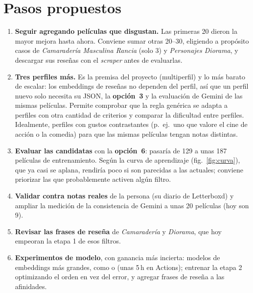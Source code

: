 \documentclass[11pt,a4paper]{article}
\newcommand{\menu}[1]{\textsf{\textbf{opción~#1}}}
\begin{document}
\section{Pasos propuestos}\label{sec:pasos}

\begin{enumerate}
  \item \textbf{Seguir agregando películas que disgustan.} Las primeras 20 dieron la mayor mejora hasta ahora. Conviene
  sumar otras 20--30, eligiendo a propósito casos de \emph{Camaradería Masculina Rancia} (solo 3) y \emph{Personajes
  Diorama}, y descargar sus reseñas con el \emph{scraper} antes de evaluarlas.
  \item \textbf{Tres perfiles más.} Es la premisa del proyecto (multiperfil) y lo más barato de escalar: los embeddings
  de reseñas no dependen del perfil, así que un perfil nuevo solo necesita su JSON, la \menu{3} y la evaluación de Gemini
  de las mismas películas. Permite comprobar que la regla genérica se adapta a perfiles con otra cantidad de criterios
  y comparar la dificultad entre perfiles. Idealmente, perfiles con gustos contrastantes (p.~ej.\ uno que valore el cine
  de acción o la comedia) para que las mismas películas tengan notas distintas.
  \item \textbf{Evaluar las \NCandidatas{} candidatas} con la \menu{6}: pasaría de 129 a unas 187 películas de
  entrenamiento. Según la curva de aprendizaje (fig.~\ref{fig:curva}), que ya casi se aplana, rendiría poco si son
  parecidas a las actuales; conviene priorizar las que probablemente activen algún filtro.
  \item \textbf{Validar contra notas reales} de la persona (su diario de Letterboxd) y ampliar la medición de la
  consistencia de Gemini a unas 20 películas (hoy son 9).
  \item \textbf{Revisar las frases de reseña} de \emph{Camaradería} y \emph{Diorama}, que hoy empeoran la etapa 1 de
  esos filtros.
  \item \textbf{Experimentos de modelo}, con ganancia más incierta: modelos de embeddings más grandes, como
   o  (unas 5\,h en Actions); entrenar la etapa 2 optimizando el orden en
  vez del error, y agregar frases de reseña a las afinidades.
\end{enumerate}

\appendix
\end{document}
